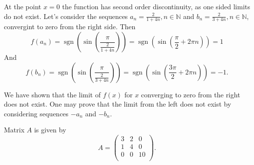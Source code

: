 \documentclass[addpoints]{exam} %
\DeclareMathOperator{\sgn}{sgn}
\begin{document}
\begin{questions}
\begin{solution}
At the point $x=0$ the function has second order discontinuity, as one sided limits do not exist. Let's consider the sequences $a_n = \frac{2}{1+4 n}, n
\in \mathbb{N}$ and $b_n = \frac{2}{3+4 n}, n \in \mathbb{N}$, convergint to zero from the right side. Then
\[
f(a_n) = {\sgn} \left(\sin \left( \frac{\pi}{\frac{2}{1+4 n}}\right)\right) = {\sgn} \left( \sin \left( \frac{\pi}{2} + 2 \pi n \right)\right)=1
\]
And
\[
f(b_n) = {\sgn} \left(\sin \left( \frac{\pi}{\frac{2}{3+4 n}}\right)\right) = {\sgn} \left( \sin \left( \frac{3 \pi}{2} + 2 \pi n \right)\right)=-1.
\]

We have shown that the limit of $f(x)$ for $x$ converging to zero from the right does not exist. One may prove that the limit from the left does not exist by considering sequences $-a_n$ and $-b_n$.
\end{solution}





\question Matrix $A$ is given by
\[
A=\begin{pmatrix}
3 & 2 & 0 \\
1 & 4 & 0 \\
0 & 0 & 10 \\
\end{pmatrix}.
\]

\end{questions}
\end{document}
